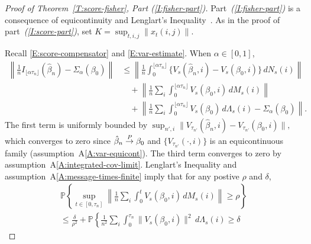 \documentclass[aoas,preprint]{imsart}
\begin{document}
\begin{proof}[Proof of Theorem~\ref{T:score-fisher}, Part \textit{(\ref{I:fisher-part})}]
Part~\textit{(\ref{I:fisher-part})} is a consequence of equicontinuity
and Lenglart's Inequality~\cite{lenglart1977relation}.  As in the proof of
part~\textit{(\ref{I:score-part})}, set $K = \sup_{t,i,j} \| x_t(i,j) \|$.

Recall \eqref{E:score-compensator} and \eqref{E:var-estimate}.
When $\alpha \in [0, 1]$,
\begin{align*}
    \left\|
        \tfrac{1}{n} I_{\lfloor \alpha \tau_n \rfloor}(\hat \beta_n)
        -
        \Sigma_{\alpha} (\beta_0)
    \right\|
        &\leq
        \left\|
            \frac{1}{n}
            \int_0^{\lfloor \alpha \tau_n \rfloor}
                \{
                    V_s(\hat \beta_n, i)
                    -
                    V_s(\beta_0, i)
                \} \, dN_s(i)
        \right\| \\
        &\quad+
        \left\|
            \frac{1}{n}
            \sum_i
            \int_0^{\lfloor \alpha \tau_n \rfloor}
                V_s(\beta_0, i) \, dM_s(i)
        \right\| \\
        &\quad+
        \left\|
            \frac{1}{n}
            \sum_i
            \int_0^{\lfloor \alpha \tau_n \rfloor}
                V_s(\beta_0)
                \, d\Lambda_s(i)
            -
            \Sigma_{\alpha}(\beta_0)
        \right\|.
\end{align*}
The first term is uniformly bounded by 
\(
    \sup_{n',i}
        \|
            V_{\tau_{n'}}(\hat \beta_n, i)
            -
            V_{\tau_{n'}}(\beta_0, i)
        \|,
\)
which converges to zero since $\hat \beta_n \overset{\mathit{P}}{\to} \beta_0$ and
$\{ V_{\tau_{n'}}(\cdot, i) \}$ is an equicontinuous family
(assumption~A\ref{A:var-equicont}).
The third term converges to zero by assumption~A\ref{A:integrated-cov-limit}.
Lenglart's Inequality and assumption~A\ref{A:message-times-finite} imply that for
any postive $\rho$ and $\delta$,
\begin{multline*}
    \mathbb{P}\left\{
        \sup_{t \in [0,\tau_n]}
        \left\|
            \frac{1}{n}
            \sum_{i}
            \int_{0}^{t}
                V_s(\beta_0, i) \, dM_s(i)
        \right\|
        \geq \rho
    \right\} \\
    \leq
    \frac{\delta}{\rho^2}
    +
    \mathbb{P}\left\{
        \frac{1}{n^2}
        \sum_{i}
        \int_{0}^{\tau_n}
            \| V_s (\beta_0, i) \|^2
            \, d\Lambda_s(i)
        \geq
        \delta

\end{multline*}
\end{proof}
\end{document}
